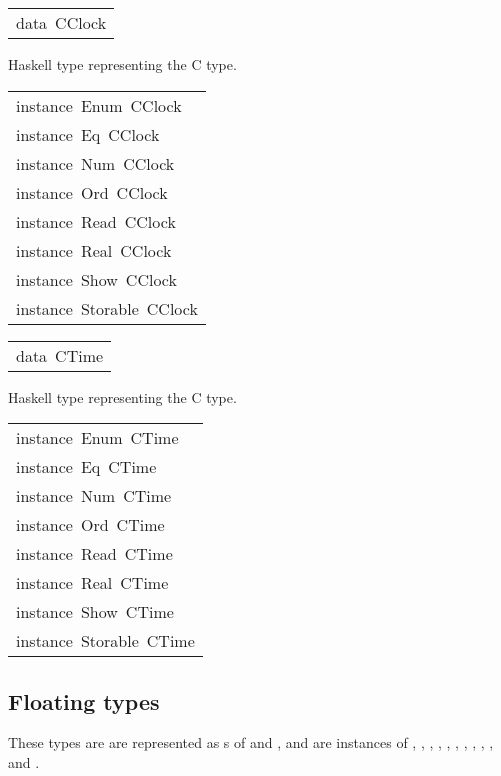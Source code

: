 \begin{haddockdesc}
\item[\begin{tabular}{@{}l}
data\ CClock
\end{tabular}]\haddockbegindoc
Haskell type representing the C  type.
\par

\end{haddockdesc}
\begin{haddockdesc}
\item[\begin{tabular}{@{}l}
instance\ Enum\ CClock\\instance\ Eq\ CClock\\instance\ Num\ CClock\\instance\ Ord\ CClock\\instance\ Read\ CClock\\instance\ Real\ CClock\\instance\ Show\ CClock\\instance\ Storable\ CClock
\end{tabular}]
\end{haddockdesc}
\begin{haddockdesc}
\item[\begin{tabular}{@{}l}
data\ CTime
\end{tabular}]\haddockbegindoc
Haskell type representing the C  type.
\par

\end{haddockdesc}
\begin{haddockdesc}
\item[\begin{tabular}{@{}l}
instance\ Enum\ CTime\\instance\ Eq\ CTime\\instance\ Num\ CTime\\instance\ Ord\ CTime\\instance\ Read\ CTime\\instance\ Real\ CTime\\instance\ Show\ CTime\\instance\ Storable\ CTime
\end{tabular}]
\end{haddockdesc}
\subsection{Floating types
}
These types are are represented as s of
  and , and are instances of
 , , , ,
 , , ,
 , , ,
  and .
\par

